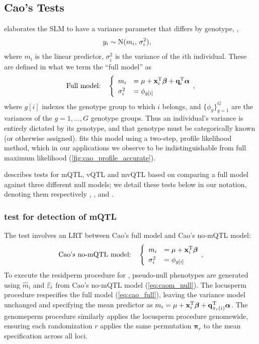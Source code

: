 \subsection{Cao's Tests}

  \cite{Cao2014} elaborates the SLM to have a variance parameter that differs by genotype, \ie,
  \begin{align}
    y_i &\sim \mathrm{N}(m_i, \,\sigma_i^2),
  \end{align}
  where $m_i$ is the linear predictor, $\sigma^2_i$ is the variance of the $i$th individual. These are defined in what we term the ``full model'' as
  \begin{equation}\label{eq:cao_full}
    \text{Full model:}\quad
    \begin{cases}
      \enskip m_i &= \mu + \mathbf{x}_i^\mathrm{T}\bm{\beta} + \mathbf{q}_i^\mathrm{T}\bm{\alpha}\\
      \enskip \sigma_i^2 &= \phi_{g[i]}
    \end{cases}
    \,,
  \end{equation}
  where $g[i]$ indexes the genotype group to which $i$ belongs, and $\{\phi_g\}^G_{g=1}$ are the variances of the $g=1,\dots,G$ genotype groups. Thus an individual's variance is entirely dictated by its genotype, and that genotype must be categorically known (or otherwise assigned).
  \citet{Cao2014} fits this model using a two-step, profile likelihood method, which in our applications we observe to be indistinguishable from full maximum likelihood (\autoref{fig:cao_profile_accurate}).
   
  \cite{Cao2014} describes tests for mQTL, vQTL and mvQTL based on comparing a full model against three different null models; we detail these tests below in our notation, denoting them respectively \Caom, \Caov, and \Caomv.

  \subsubsection{\Caom test for detection of mQTL}
    The \Caom test involves an LRT between {Cao's full model} and {Cao's no-mQTL model}:
    \begin{equation}\label{eq:caom_null}
      \text{Cao's no-mQTL model:}\quad
      \begin{cases}
        \enskip m_i &= \mu + \mathbf{x}_i^\mathrm{T}\bm{\beta}\\
        \enskip \sigma_i^2 &= \phi_{g[i]}
      \end{cases}
      \,,
    \end{equation}
    To execute the residperm procedure for \Caom, pseudo-null phenotypes are generated using $\widehat{m}_i$ and $\widehat{\varepsilon}_i$ from Cao's no-mQTL model (\autoref{eq:caom_null}).
    The locusperm procedure respecifies the full model (\autoref{eq:cao_full}), leaving the variance model unchanged and specifying the mean predictor as $m_i =\mu + \mathbf{x}_i^\mathrm{T}\bm{\beta} + \mathbf{q}_{\pi_r(i)}^\mathrm{T}\boldsymbol{\alpha}$.
    The genomeperm procedure similarly applies the locusperm procedure genomewide, ensuring each randomization $r$ applies the same permutation $\bm{\pi}_r$ to the mean specification across all loci.

